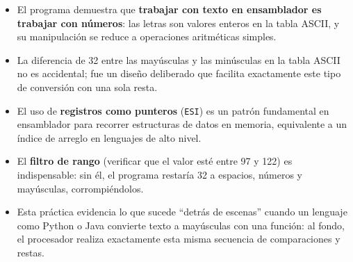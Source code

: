 \documentclass[12pt, letterpaper]{article}
\begin{document}
\begin{itemize}
    \item El programa demuestra que \textbf{trabajar con texto en ensamblador es trabajar con números}: las letras son valores enteros en la tabla ASCII, y su manipulación se reduce a operaciones aritméticas simples.
    \item La diferencia de 32 entre las mayúsculas y las minúsculas en la tabla ASCII no es accidental; fue un diseño deliberado que facilita exactamente este tipo de conversión con una sola resta.
    \item El uso de \textbf{registros como punteros} (\texttt{ESI}) es un patrón fundamental en ensamblador para recorrer estructuras de datos en memoria, equivalente a un índice de arreglo en lenguajes de alto nivel.
    \item El \textbf{filtro de rango} (verificar que el valor esté entre 97 y 122) es indispensable: sin él, el programa restaría 32 a espacios, números y mayúsculas, corrompiéndolos.
    \item Esta práctica evidencia lo que sucede ``detrás de escenas'' cuando un lenguaje como Python o Java convierte texto a mayúsculas con una función: al fondo, el procesador realiza exactamente esta misma secuencia de comparaciones y restas.
\end{itemize}
\end{document}
